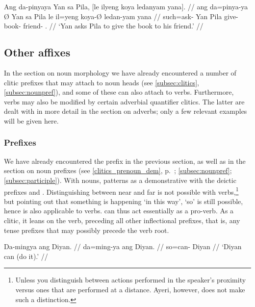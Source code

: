 \a\begingl
	\gla Ang da-pinyaya {} Yan sa Pila, {\normalfont [}le ilyeng koya 
		ledanyam yana{\normalfont]}. //
	\glb ang da=pinya-ya Ø Yan sa Pila le il=yeng koya-Ø ledan-yam
		yana //
	\glc \AgtT{} such=ask-\TsgM{} \Top{} Yan \Parg{} Pila \PatTI{} 
		give-\TsgF{} book-\Top{} friend-\Dat{} \TsgM{}.\Gen{} //
	\glft `Yan asks Pila to give the book to his friend.' //
\endgl
\xe


\subsection{Other affixes}

In the section on noun morphology we have already encountered a number of
clitic prefixes that may attach to noun heads (see \autoref{subsec:clitics},
\autoref{subsec:nounpref}),  and some of these can also attach to verbs.
Furthermore, verbs may also be  modified by certain adverbial quantifier
clitics. The latter are dealt with in  more detail in the section on adverbs;
only a few relevant examples will be  given here.

\subsubsection{Prefixes}
\label{subsubsec:verbprefixes}

We have already encountered the prefix  in the
previous section, as well as in the section on noun prefixes (see
\autoref{clitics_prenoun_dem}, p.~\pageref{clitics_prenoun_dem}; 
\ref{subsec:nounpref}; \ref{subsec:participle}). With nouns,
 patterns as a demonstrative with the deictic prefixes
 and . Distinguishing between near
and far is not possible with verbs,\footnote{Unless you distinguish between
actions performed in the speaker's proximity versus ones that are performed at
a distance. Ayeri, however, does not make such a distinction.} but pointing
out that something is happening `in this way', `so' is still possible, hence
 is also applicable to verbs.  can thus act
essentially as a pro-verb. As a clitic, it leans on the verb, preceding all
other inflectional prefixes, that is, any tense prefixes that may possibly
precede the verb root.

\pex\label{ex:daproverb}
\a\begingl
	\gla Da-mingya ang Diyan. //
	\glb da=ming-ya ang Diyan. //
	\glc so=can-\TsgM{} \Aarg{} Diyan //
	\glft `Diyan can (do it).' //
\endgl

